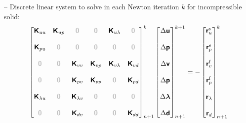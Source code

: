 \documentclass[a4paper,12pt]{report}
\newcommand{\bs}[1]{\boldsymbol{#1}}
\newcommand{\zerom}{\textcolor{lightgray}{\bs{\mathsf{0}}}}
\newcommand{\ROP}{\bs{\mathsf{r}}}
\newcommand{\LM}{\bs{\mathsf{\lambda}}}
\newcommand{\lmi}{\lambda} %
\begin{document}
-- Discrete linear system to solve in each Newton iteration $k$ for incompressible solid:
\begin{equation}
\label{equation-lin-sys-fsi-inc}
\begin{aligned}
\begin{bmatrix} \bs{\mathsf{K}}_{uu} & \bs{\mathsf{K}}_{up} & \zerom & \zerom & \bs{\mathsf{K}}_{u\lmi} & \zerom \\ \\ \bs{\mathsf{K}}_{pu} & \zerom & \zerom & \zerom & \zerom & \zerom \\ \\ \zerom & \zerom & \bs{\mathsf{K}}_{vv} & \bs{\mathsf{K}}_{vp} & \bs{\mathsf{K}}_{v\lmi} & \bs{\mathsf{K}}_{vd} \\ \\ \zerom & \zerom & \bs{\mathsf{K}}_{pv} & \bs{\mathsf{K}}_{pp} & \zerom & \bs{\mathsf{K}}_{pd} \\ \\ \bs{\mathsf{K}}_{\lmi u} & \zerom & \bs{\mathsf{K}}_{\lmi v} & \zerom & \zerom & \zerom \\ \\ \zerom &  \zerom & \bs{\mathsf{K}}_{dv}  & \zerom & \zerom & \bs{\mathsf{K}}_{dd} \end{bmatrix}_{n+1}^{k}\begin{bmatrix} \Delta\bs{\mathsf{u}} \\ \\ \Delta\bs{\mathsf{p}} \\ \\ \Delta\bs{\mathsf{v}} \\ \\ \Delta\bs{\mathsf{p}} \\ \\ \Delta\LM \\ \\ \Delta\bs{\mathsf{d}} \end{bmatrix}_{n+1}^{k+1}=-\begin{bmatrix} \ROP_{u}^{\mathrm{s}} \\ \\ \ROP_{p}^{\mathrm{s}} \\ \\ \ROP_{v}^{\mathrm{f}} \\ \\ \ROP_{p}^{\mathrm{f}} \\ \\ \ROP_{\lmi} \\ \\ \ROP_{d}\end{bmatrix}_{n+1}^{k}
\end{aligned}
\end{equation}
\end{document}
